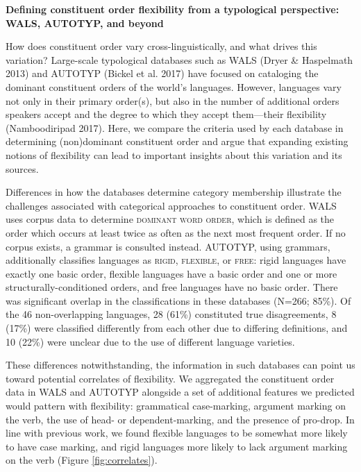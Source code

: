 \documentclass[10pt,letterpaper]{article}
\title{}
\author{}
\date{}
\begin{document}
\noindent\textbf{Defining constituent order flexibility from a typological perspective: WALS, AUTOTYP, and beyond}

\vspace{1cm}

\noindent How does constituent order vary cross-linguistically, and what drives
this variation? Large-scale typological databases such as WALS (Dryer \&
Haspelmath 2013) and AUTOTYP (Bickel et al. 2017) have focused on
cataloging the dominant constituent orders of the world's languages.
However, languages vary not only in their primary order(s), but also in
the number of additional orders speakers accept and the degree to which
they accept them---their flexibility (Namboodiripad 2017). Here, we
compare the criteria used by each database in determining (non)dominant
constituent order and argue that expanding existing notions of
flexibility can lead to important insights about this variation and its
sources.

Differences in how the databases determine category membership
illustrate the challenges associated with categorical approaches to
constituent order. WALS uses corpus data to determine
\textsc{dominant word order}, which is defined as the order which occurs
at least twice as often as the next most frequent order. If no corpus
exists, a grammar is consulted instead. AUTOTYP, using grammars,
additionally classifies languages as \textsc{rigid}, \textsc{flexible},
or \textsc{free}: rigid languages have exactly one basic order, flexible
languages have a basic order and one or more structurally-conditioned
orders, and free languages have no basic order. There was significant
overlap in the classifications in these databases (N=266; 85\%). Of the
46 non-overlapping languages, 28 (61\%) constituted true disagreements,
8 (17\%) were classified differently from each other due to differing
definitions, and 10 (22\%) were unclear due to the use of different
language varieties.

These differences notwithstanding, the information in such databases can
point us toward potential correlates of flexibility. We aggregated the
constituent order data in WALS and AUTOTYP alongside a set of additional
features we predicted would pattern with flexibility: grammatical
case-marking, argument marking on the verb, the use of head- or
dependent-marking, and the presence of pro-drop. In line with previous
work, we found flexible languages to be somewhat more likely to have
case marking, and rigid languages more likely to lack argument marking
on the verb (Figure \ref{fig:correlates}).
\end{document}
